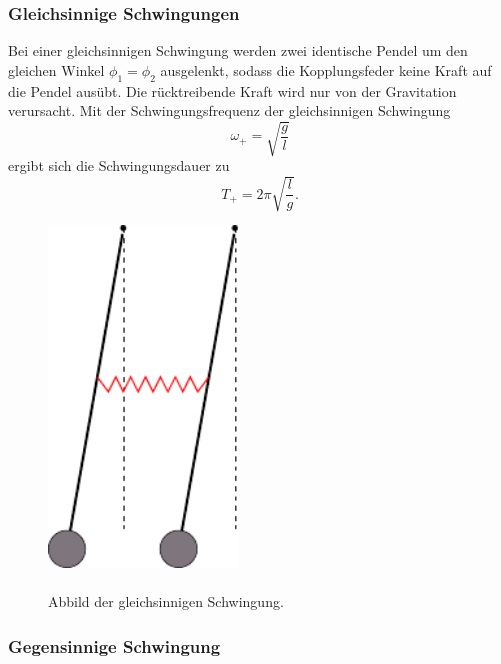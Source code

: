 \subsubsection{Gleichsinnige Schwingungen}
\label{subsec:Gleich}
\begin{minipage}[t]{0.5\textwidth}
Bei einer gleichsinnigen Schwingung werden zwei identische Pendel um den gleichen Winkel $\phi_1 = \phi_2$ ausgelenkt, sodass die Kopplungsfeder keine Kraft auf die Pendel ausübt.
Die rücktreibende Kraft wird nur von der Gravitation verursacht.
Mit der Schwingungsfrequenz der gleichsinnigen Schwingung
\begin{equation}
    \omega_+ = \sqrt{\frac{g}{l}}
    \label{eqn:omega+}
\end{equation}
ergibt sich die Schwingungsdauer zu
\begin{equation}
    T_+ = 2 \pi \sqrt{\frac{l}{g}}.
    \label{eqn:T+}
\end{equation}
\end{minipage}
\begin{minipage}[t]{0.5\textwidth}
    \begin{figure}[H]
        \centering
        \includegraphics[width=0.45\textwidth]{build/Abb_1.pdf}
\caption{\\Abbild der gleichsinnigen Schwingung. \cite{V106}}
        \label{fig:gleich}
      \end{figure}
\end{minipage}
\subsubsection{Gegensinnige Schwingung}

